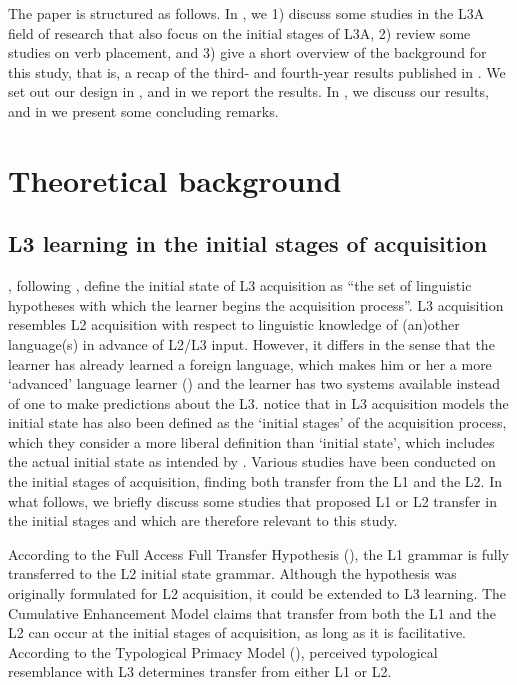 \documentclass[output=paper,modfonts,nonflat, newtxmath]{langsci/langscibook}
\begin{document}
  The paper is structured as follows. In , we 1) discuss some studies in the L3A field of research that also focus on the initial stages of L3A, 2) review some studies on verb placement, and 3) give a short overview of the background for this study, that is, a recap of the third- and fourth-year results published in \citet{StadtEtAl2016, StadtEtAl2018Exposure}. We set out our design in , and in  we report the results. In , we discuss our results, and in  we present some concluding remarks.

\section{Theoretical background}%
\label{sec:stadt:2}
\subsection{ L3 learning in the initial stages of acquisition}%
\label{sec:stadt:2.1}

 \citet[15]{GarciaMayoRothman2012}, following \citet{SchwartzSprouse1996}, define the initial state of L3 acquisition as “the set of linguistic hypotheses with which the learner begins the acquisition process”. L3 acquisition resembles L2 acquisition with respect to linguistic knowledge of (an)other language(s) in advance of L2/L3 input. However, it differs in the sense that the learner has already learned a foreign language, which makes him or her a more ‘advanced’ language learner (\citealt{CenozValencia1994, Jessner2006}) and the learner has two systems available instead of one to make predictions about the L3. \citet[fn. 12]{GarciaMayoRothman2012} notice that in L3 acquisition models the initial state has also been defined as the ‘initial stages’ of the acquisition process, which they consider a more liberal definition than ‘initial state’, which includes the actual initial state as intended by \citet{SchwartzSprouse1996}. Various studies have been conducted on the initial stages of acquisition, finding both transfer from the L1 and the L2. In what follows, we briefly discuss some studies that proposed L1 or L2 transfer in the initial stages and which are therefore relevant to this study.

According to the Full Access Full Transfer Hypothesis (\citealt{SchwartzSprouse1996}), the L1 grammar is fully transferred to the L2 initial state grammar. Although the hypothesis was originally formulated for L2 acquisition, it could be extended to L3 learning. The Cumulative Enhancement Model \citep{FlynnEtAl2004} claims that transfer from both the L1 and the L2 can occur at the initial stages of acquisition, as long as it is facilitative. According to the Typological Primacy Model (\citealt{Rothman2010, Rothman2011, Rothman2015}), perceived typological resemblance with L3 determines transfer from either L1 or L2.
\end{document}
